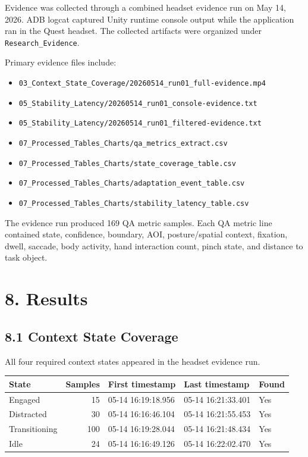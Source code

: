 \documentclass[
  10pt,
]{article}
\newcounter{none} %
\providecommand{\tightlist}{%
  \setlength{\itemsep}{0pt}\setlength{\parskip}{0pt}}
\begin{document}
Evidence was collected through a combined headset evidence run on May
14, 2026. ADB logcat captured Unity runtime console output while the
application ran in the Quest headset. The collected artifacts were
organized under \texttt{Research\_Evidence}.

Primary evidence files include:

\begin{itemize}
\tightlist
\item
  \texttt{03\_Context\_State\_Coverage/20260514\_run01\_full-evidence.mp4}
\item
  \texttt{05\_Stability\_Latency/20260514\_run01\_console-evidence.txt}
\item
  \texttt{05\_Stability\_Latency/20260514\_run01\_filtered-evidence.txt}
\item
  \texttt{07\_Processed\_Tables\_Charts/qa\_metrics\_extract.csv}
\item
  \texttt{07\_Processed\_Tables\_Charts/state\_coverage\_table.csv}
\item
  \texttt{07\_Processed\_Tables\_Charts/adaptation\_event\_table.csv}
\item
  \texttt{07\_Processed\_Tables\_Charts/stability\_latency\_table.csv}
\end{itemize}

The evidence run produced 169 QA metric samples. Each QA metric line
contained state, confidence, boundary, AOI, posture/spatial context,
fixation, dwell, saccade, body activity, hand interaction count, pinch
state, and distance to task object.

\section{8. Results}\label{results}

\subsection{8.1 Context State Coverage}\label{context-state-coverage}

All four required context states appeared in the headset evidence run.

{\def\LTcaptype{none} %
\begin{longtable}[]{@{}lrlll@{}}
\toprule\noalign{}
State & Samples & First timestamp & Last timestamp & Found \\
\midrule\noalign{}
\endhead
\bottomrule\noalign{}
\endlastfoot
Engaged & 15 & 05-14 16:19:18.956 & 05-14 16:21:33.401 & Yes \\
Distracted & 30 & 05-14 16:16:46.104 & 05-14 16:21:55.453 & Yes \\
Transitioning & 100 & 05-14 16:19:28.044 & 05-14 16:21:48.434 & Yes \\
Idle & 24 & 05-14 16:16:49.126 & 05-14 16:22:02.470 & Yes \\
\end{longtable}
}
\end{document}
